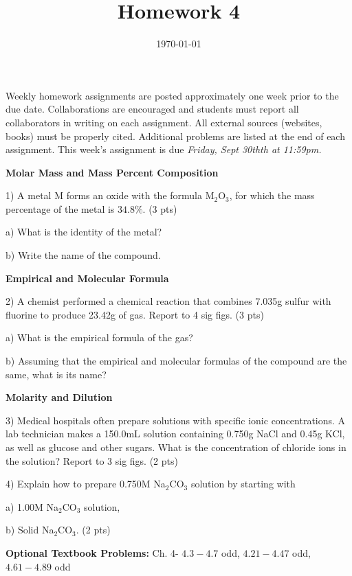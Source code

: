\documentclass[12pt]{article}
\title{\textbf{Homework 4}}
\date{\vspace{-2em}\today}
\begin{document}
\maketitle 

Weekly homework assignments are posted approximately one week prior to the
due date. Collaborations are encouraged and students must report all collaborators
in writing on each assignment. All external sources (websites, books) must be
properly cited. Additional problems are listed at the end of each assignment.
This week's assignment is due \textit{Friday, Sept 30thth at 11:59pm.}

\textbf{Molar Mass and Mass Percent Composition}

1) A metal M forms an oxide with the formula M$_2$O$_3$, for which the mass
percentage of the metal is $34.8\%$. (3 pts)

a) What is the identity of the metal?

b) Write the name of the compound.

\vspace{1.65in}

\textbf{Empirical and Molecular Formula}

2) A chemist performed a chemical reaction that combines 7.035g sulfur with
fluorine to produce 23.42g of gas. Report to 4 sig figs. (3 pts)

a) What is the empirical formula of the gas?

b) Assuming that the empirical and molecular formulas of the compound are the same,
what is its name?

\newpage

\textbf{Molarity and Dilution}

3) Medical hospitals often prepare solutions with specific ionic concentrations. A
lab technician makes a 150.0mL solution containing 0.750g NaCl and 0.45g KCl, as well
as glucose and other sugars. What is the concentration of chloride ions in the solution?
Report to 3 sig figs. (2 pts)

\vspace{2in}

4) Explain how to prepare 0.750M Na$_2$CO$_3$ solution by starting with

a) 1.00M Na$_2$CO$_3$ solution,

b) Solid Na$_2$CO$_3$. (2 pts)


\vfill

\textbf{Optional Textbook Problems:} Ch. 4- $4.3-4.7$ odd, $4.21-4.47$ odd, $4.61-4.89$ odd
\end{document}
